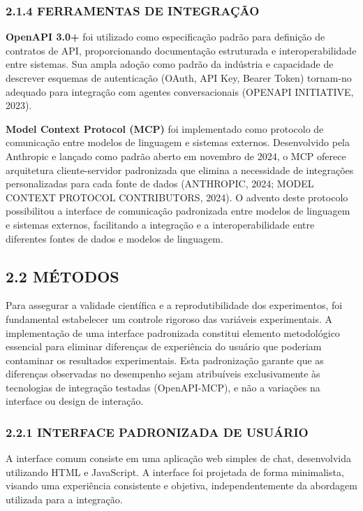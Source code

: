 \documentclass[
]{article}
\begin{document}
\subsubsection{2.1.4 FERRAMENTAS DE
INTEGRAÇÃO}\label{ferramentas-de-integrauxe7uxe3o}

\textbf{OpenAPI 3.0+} foi utilizado como especificação padrão para
definição de contratos de API, proporcionando documentação estruturada e
interoperabilidade entre sistemas. Sua ampla adoção como padrão da
indústria e capacidade de descrever esquemas de autenticação (OAuth, API
Key, Bearer Token) tornam-no adequado para integração com agentes
conversacionais (OPENAPI INITIATIVE, 2023).

\textbf{Model Context Protocol (MCP)} foi implementado como protocolo de
comunicação entre modelos de linguagem e sistemas externos. Desenvolvido
pela Anthropic e lançado como padrão aberto em novembro de 2024, o MCP
oferece arquitetura cliente-servidor padronizada que elimina a
necessidade de integrações personalizadas para cada fonte de dados
(ANTHROPIC, 2024; MODEL CONTEXT PROTOCOL CONTRIBUTORS, 2024). O advento
deste protocolo possibilitou a interface de comunicação padronizada
entre modelos de linguagem e sistemas externos, facilitando a integração
e a interoperabilidade entre diferentes fontes de dados e modelos de
linguagem.

\subsection{2.2 MÉTODOS}\label{muxe9todos}

Para assegurar a validade científica e a reprodutibilidade dos
experimentos, foi fundamental estabelecer um controle rigoroso das
variáveis experimentais. A implementação de uma interface padronizada
constitui elemento metodológico essencial para eliminar diferenças de
experiência do usuário que poderiam contaminar os resultados
experimentais. Esta padronização garante que as diferenças observadas no
desempenho sejam atribuíveis exclusivamente às tecnologias de integração
testadas (OpenAPI-MCP), e não a variações na interface ou design de
interação.

\subsubsection{2.2.1 INTERFACE PADRONIZADA DE
USUÁRIO}\label{interface-padronizada-de-usuuxe1rio}

A interface comum consiste em uma aplicação web simples de chat,
desenvolvida utilizando HTML e JavaScript. A interface foi projetada de
forma minimalista, visando uma experiência consistente e objetiva,
independentemente da abordagem utilizada para a integração.
\end{document}
